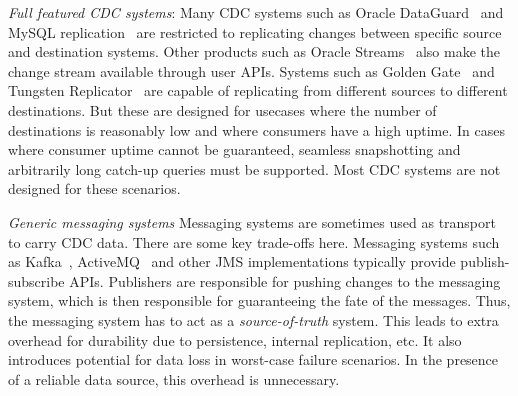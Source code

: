 \begin{itemize*}
\item \emph{Full featured CDC systems}: Many CDC systems such as Oracle DataGuard~\cite{dataguard} and MySQL replication~\cite{mysqlrepl} are restricted to replicating changes between specific source and destination systems. Other products such as Oracle Streams~\cite{streams} also make the change stream available through user APIs. Systems such as Golden Gate~\cite{goldengate} and Tungsten Replicator~\cite{tungsten} are capable of replicating from different sources to different destinations. But these are designed for usecases where the number of destinations is reasonably low and where consumers have a high uptime. In cases where consumer uptime cannot be guaranteed, seamless snapshotting and arbitrarily long catch-up queries must be supported. Most CDC systems are not designed for these scenarios.
 
\item \emph{Generic messaging systems}
Messaging systems are sometimes used as transport to carry CDC data. There are some key trade-offs here. Messaging systems such as Kafka~\cite{kafka}, ActiveMQ~\cite{activemq} and other JMS implementations typically provide publish-subscribe APIs. Publishers are responsible for pushing changes to the messaging system, which is then responsible for guaranteeing the fate of the messages. Thus, the messaging system has to act as a \emph{source-of-truth} system. 
This leads to extra overhead for durability due to persistence, internal replication, etc. It also introduces potential for data loss in worst-case failure scenarios. In the presence of a reliable data source, this overhead is unnecessary.
\end{itemize*}

